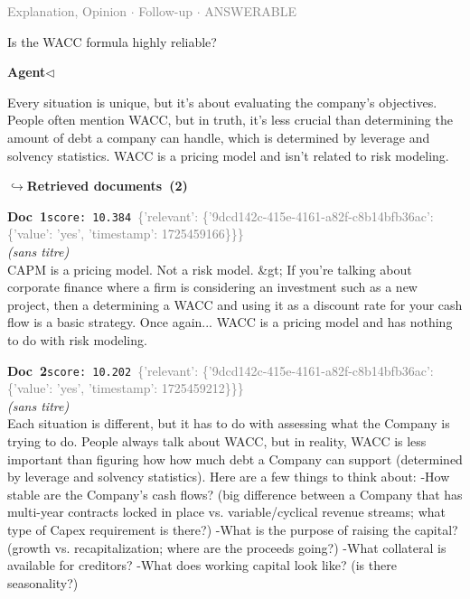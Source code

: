 \documentclass[a4paper,11pt]{article}
\begin{document}
\vspace{0.5em}
\hfill{\tiny\textcolor{gray}{Explanation, Opinion $\cdot$ Follow-up $\cdot$ ANSWERABLE}}
\begin{userbubble}
Is the WACC formula highly reliable?
\end{userbubble}
\noindent\hfill{\small\textcolor{agentcolor}{\textbf{Agent\enspace$\triangleleft$}}}
\begin{agentbubble}
Every situation is unique, but it's about evaluating the company's objectives. People often mention WACC, but in truth, it's less crucial than determining the amount of debt a company can handle, which is determined by leverage and solvency statistics. WACC is a pricing model and isn't related to risk modeling.
\end{agentbubble}
\noindent\hfill{\footnotesize\textcolor{doccolor}{\textbf{$\hookrightarrow$\enspace Retrieved documents~(2)}}}
\begin{docenv}
{\footnotesize\textcolor{doccolor}{\textbf{Doc~1}}}\hfill{\tiny\texttt{score:~10.384}}\ {\tiny\textcolor{gray}{\{'relevant': \{'9dcd142c-415e-4161-a82f-c8b14bfb36ac': \{'value': 'yes', 'timestamp': 1725459166\}\}\}}}\\[3pt]
{\small\textit{(sans titre)}}\\[2pt]
\vspace{2pt}
{\footnotesize 
CAPM is a pricing model.  Not a risk model.  \&gt; If you're talking about corporate finance where a firm is considering an investment such as a new project, then a determining a WACC and using it as a discount rate for your cash flow is a basic strategy.  Once again... WACC is a pricing model and has nothing to do with risk modeling.}
\end{docenv}
\begin{docenv}
{\footnotesize\textcolor{doccolor}{\textbf{Doc~2}}}\hfill{\tiny\texttt{score:~10.202}}\ {\tiny\textcolor{gray}{\{'relevant': \{'9dcd142c-415e-4161-a82f-c8b14bfb36ac': \{'value': 'yes', 'timestamp': 1725459212\}\}\}}}\\[3pt]
{\small\textit{(sans titre)}}\\[2pt]
\vspace{2pt}
{\footnotesize 
Each situation is different, but it has to do with assessing what the Company is trying to do. People always talk about WACC, but in reality, WACC is less important than figuring how how much debt a Company can support (determined by leverage and solvency statistics).  Here are a few things to think about:  -How stable are the Company's cash flows? (big difference between a Company that has multi-year contracts locked in place vs. variable/cyclical revenue streams; what type of Capex requirement is there?)  -What is the purpose of raising the capital? (growth vs. recapitalization; where are the proceeds going?)  -What collateral is available for creditors?  -What does working capital look like? (is there seasonality?)}
\end{docenv}
\end{document}
